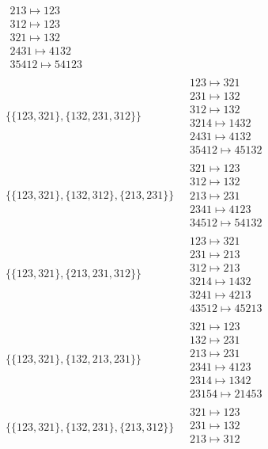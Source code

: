 \begin{scriptsize}
\begin{align}
\begin{matrix}
213 \mapsto 123
\\
312 \mapsto 123
\\
321 \mapsto 132
\\
2431 \mapsto 4132
\\
35412 \mapsto 54123
\end{matrix}
\\
\{\{123, 321\}, \{132, 231, 312\}\}
\ 
&
\begin{matrix}
123 \mapsto 321
\\
231 \mapsto 132
\\
312 \mapsto 132
\\
3214 \mapsto 1432
\\
2431 \mapsto 4132
\\
35412 \mapsto 45132
\end{matrix}
\\
\{\{123, 321\}, \{132, 312\}, \{213, 231\}\}
\ 
&
\begin{matrix}
321 \mapsto 123
\\
312 \mapsto 132
\\
213 \mapsto 231
\\
2341 \mapsto 4123
\\
34512 \mapsto 54132
\end{matrix}
\\
\{\{123, 321\}, \{213, 231, 312\}\}
\ 
&
\begin{matrix}
123 \mapsto 321
\\
231 \mapsto 213
\\
312 \mapsto 213
\\
3214 \mapsto 1432
\\
3241 \mapsto 4213
\\
43512 \mapsto 45213
\end{matrix}
\\
\{\{123, 321\}, \{132, 213, 231\}\}
\ 
&
\begin{matrix}
321 \mapsto 123
\\
132 \mapsto 231
\\
213 \mapsto 231
\\
2341 \mapsto 4123
\\
2314 \mapsto 1342
\\
23154 \mapsto 21453
\end{matrix}
\\
\{\{123, 321\}, \{132, 231\}, \{213, 312\}\}
\ 
&
\begin{matrix}
321 \mapsto 123
\\
231 \mapsto 132
\\
213 \mapsto 312
\\

\end{matrix}
\end{align}
\end{scriptsize}
